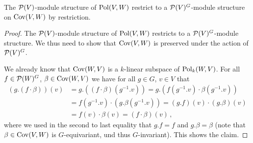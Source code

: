 \begin{proposition}
  The $\mathcal{P}(V)$-module structure of $\operatorname{Pol}(V,W)$ restrict to a $\mathcal{P}(V)^G$-module structure on $\operatorname{Cov}(V,W)$ by restriction.
\end{proposition}
\begin{proof}
  The $\mathcal{P}(V)$-module structure of $\operatorname{Pol}(V,W)$ restricts to a $\mathcal{P}(V)^G$-module structure.
  We thus need to show that $\operatorname{Cov}(V,W)$ is preserved under the action of $\mathcal{P}(V)^G$.
  
  We already know that $\operatorname{Cov}(W,V)$ is a $k$-linear subspace of $\operatorname{Pol}_k(W,V)$.
  For all $f \in \mathcal{P}(W)^G$, $\beta \in \operatorname{Cov}(W,V)$ we have for all $g \in G$, $v \in V$ that
  \begin{align*}
        (g.(f \cdot \beta))(v)
    &=  g.\left( (f \cdot \beta) \left( g^{-1}.v \right) \right)
     =  g.\left(
                f\left( g^{-1}.v \right)
          \cdot \beta\left( g^{-1}.v \right)
        \right) \\
    &=        f\left( g^{-1}.v \right)
        \cdot \left(
                g.\beta\left( g^{-1}.v \right)
              \right)
     =  (g.f)(v) \cdot (g.\beta)(v) \\
    &=  f(v) \cdot \beta(v)
     =  (f \cdot \beta)(v) \,,
  \end{align*}
  where we used in the second to last equality that $g.f = f$ and $g.\beta = \beta$ (note that $\beta \in \operatorname{Cov}(V,W)$ is $G$-equivariant, und thus $G$-invariant).
  This shows the claim.
\end{proof}
